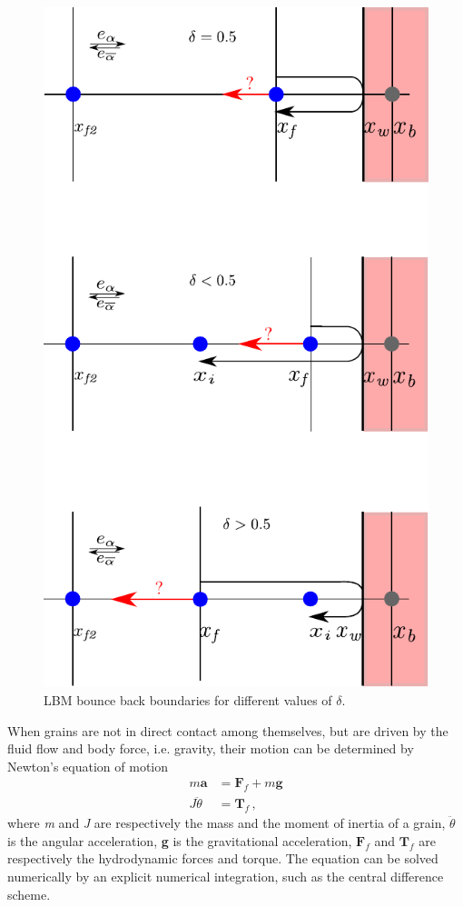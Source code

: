 \begin{figure}[htbp]
\centering
\includegraphics[height=0.9\textheight]{bouncemod}
\caption{LBM bounce back boundaries for different values of $\delta$.}
\label{fig:bouncemod}
\end{figure}

When grains are not in direct contact among themselves, but are driven by 
the fluid flow and body force, i.e. gravity, their motion can be determined by 
Newton's equation of motion
%
\begin{align}
\mathit{m}\mathbf{ a} & = \mathbf{F}_{f} + \mathit{m }\mathbf{g} \\
\mathit{J } \ddot{\theta} & = \mathbf{T}_{f} \,,
\end{align}
%
\noindent where \textit{m} and \textit{J} are respectively the mass and the 
moment of inertia of a grain, $\ddot{\theta}$ is the 
angular acceleration, \textbf{g} is the gravitational acceleration,
$\mathbf{F}_{f}$ and $\mathbf{T}_{f}$ are respectively the hydrodynamic forces 
and torque. The equation can be solved numerically by an explicit numerical 
integration, such as the central difference scheme. 

